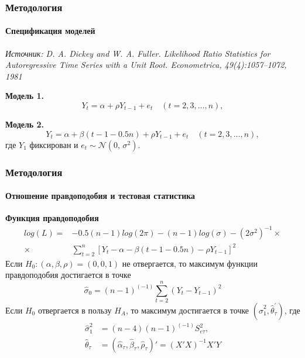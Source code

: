 \documentclass{beamer}
\begin{document}
\begin{frame}
\frametitle{Методология}
\framesubtitle{Спецификация моделей}
\emph{Источник:  D. A. Dickey and W. A. Fuller. Likelihood Ratio Statistics for Autoregressive Time Series with a Unit Root. Econometrica, 49(4):1057–1072, 1981}

\textbf{Модель 1.}
\begin{equation}
	Y_t=\alpha+\rho Y_{t-1}+e_t\quad (t=2,3,\ldots,n),
\end{equation}

\textbf{Модель 2.}
\begin{equation}
	Y_t=\alpha+\beta(t-1-0.5n)+\rho Y_{t-1}+e_t\quad (t=2,3,\ldots,n),
\end{equation}
где $Y_1$ фиксирован и $e_t \sim \mathcal{N}(0,\,\sigma^{2})$.
\end{frame}

\begin{frame}
	\frametitle{Методология}
	\framesubtitle{Отношение правдоподобия и тестовая статистика}
	\textbf{Функция правдоподобия}
	\begin{align}
	\label{eq:likefun}
	log{(L)}=&-0.5(n-1)log(2\pi)-(n-1)log{(\sigma)}-(2\sigma^2)^{-1}\times\\
	\times&\sum_{t=2}^{n}\left[Y_t-\alpha-\beta(t-1-0.5n)-\rho Y_{t-1}\right]^2
	\end{align}
	Если $H_0:(\alpha,\beta,\rho)=(0,0,1)$ не отвергается, то максимум функции правдоподобия достигается в точке
	\begin{equation}
	\hat{\sigma}_0=(n-1)^{(-1)}\sum_{t=2}^n(Y_t-Y_{t-1})^2
	\end{equation}
	Если $H_0$ отвергается в пользу $H_A$, то максимум достигается в точке $(\hat{\sigma}_1^2,\hat{\theta}_\tau^{'})$, где
	\begin{align}
	\hat{\sigma}_1^2&=(n-4)(n-1)^{(-1)}S^2_{e\tau},\\
	\hat{\theta}_\tau&=(\hat{\alpha}_\tau,\hat{\beta}_\tau,\hat{\rho}_\tau)'=(X'X)^{-1}X'Y
	\end{align}
\end{frame}
\end{document}
